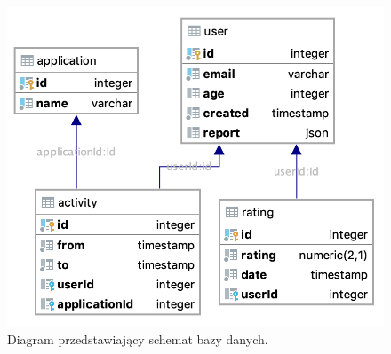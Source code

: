 \documentclass[a4paper,twoside,12pt]{book}
\begin{document}
\begin{description}
\begin{figure}[h!]
    \centering
    \includegraphics[width=\textwidth]{images/db_schema.png}
    \caption{Diagram przedstawiający schemat bazy danych.\protect\footnotemark}
    \label{fig:bd}
\end{figure}



\end{description}
\end{document}
